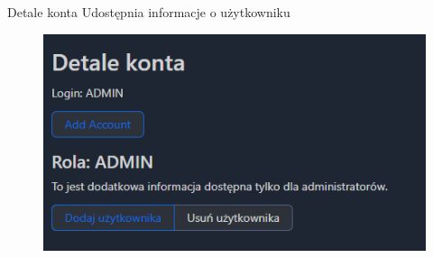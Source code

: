 \begin{frame}{\insertsection}
	\begin{block}{Detale konta}
		Udostępnia informacje o użytkowniku
	\end{block}
	\begin{figure}
		\centering
		\includegraphics[width=0.7\linewidth]{../images/DetaleKonta}
		\label{fig:detalekonta}
	\end{figure}
\end{frame}

